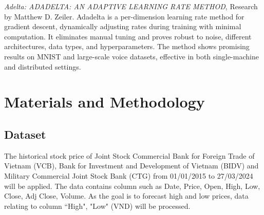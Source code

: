 \documentclass{ieeeojies}
\begin{document}
\textit{Adelta: ADADELTA: AN ADAPTIVE LEARNING RATE METHOD}, Research by Matthew D. Zeiler. Adadelta is a per-dimension learning rate method for gradient descent, dynamically adjusting rates during training with minimal computation. It eliminates manual tuning and proves robust to noise, different architectures, data types, and hyperparameters. The method shows promising results on MNIST and large-scale voice datasets, effective in both single-machine and distributed settings. \cite{b6} 

\section{Materials and Methodology}
\subsection{Dataset}
The historical stock price of Joint Stock Commercial Bank for Foreign Trade of Vietnam (VCB), Bank for Investment and Development of Vietnam (BIDV) and Military Commercial Joint Stock Bank (CTG) from 01/01/2015 to 27/03/2024 will be applied. The data contains column such as Date, Price, Open, High, Low, Close, Adj Close, Volume. As the goal is to forecast high and low prices, data relating to column “High", "Low" (VND) will be processed.
\end{document}
